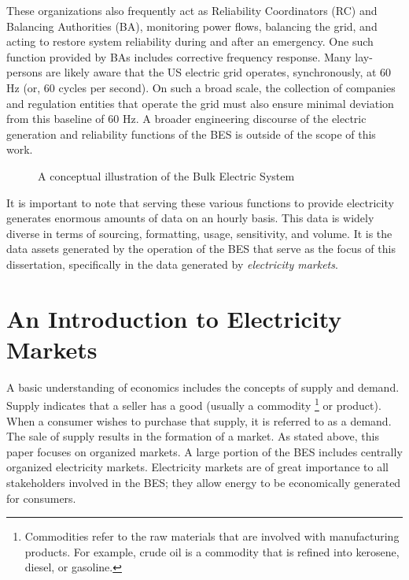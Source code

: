 These organizations also frequently act as Reliability Coordinators (RC) and Balancing Authorities (BA), monitoring power flows, balancing the grid, and acting to restore system reliability during and after an emergency. One such function provided by BAs includes corrective frequency response. Many lay-persons are likely aware that the US electric grid operates, synchronously, at 60 Hz (or, 60 cycles per second). On such a broad scale, the collection of companies and regulation entities that operate the grid must also ensure minimal deviation from this baseline of 60 Hz. A broader engineering discourse of the electric generation and reliability functions of the BES is outside of the scope of this work.

\begin{figure}
\centering
{}
\caption{A conceptual illustration of the Bulk Electric System} 
\label{fig:BES_1}
\end{figure}

It is important to note that serving these various functions to provide electricity generates enormous amounts of data on an hourly basis. This data is widely diverse in terms of sourcing, formatting, usage, sensitivity, and volume. It is the data assets generated by the operation of the BES that serve as the focus of this dissertation, specifically in the data generated by \textit{electricity markets}.
\section{An Introduction to Electricity Markets}

A basic understanding of economics includes the concepts of supply and demand. Supply indicates that a seller has a good (usually a commodity \footnote{Commodities refer to the raw materials that are involved with manufacturing products. For example, crude oil is a commodity that is refined into kerosene, diesel, or gasoline.}
or product). When a consumer wishes to purchase that supply, it is referred to as a demand. The sale of supply results in the formation of a market. As stated above, this paper focuses on organized markets.  A large portion of the BES includes centrally organized electricity markets. Electricity markets are of great importance to all stakeholders involved in the BES; they allow energy to be economically generated for consumers.

